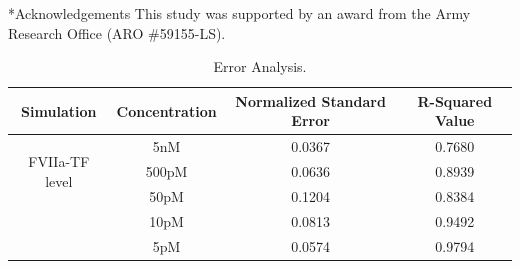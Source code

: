 \documentclass[12pt]{article}
\makeatletter
\renewcommand\section{\@startsection
	{subsection}{2}{0mm}
	{-0.2in}
	{0.05\baselineskip}
	{\normalfont\large\bfseries}}
\makeatother
\begin{document}
\section*{Acknowledgements}
This study was supported by an award from the Army Research Office (ARO \#59155-LS).
\clearpage

%


\clearpage

\begin{table}[h]
\centering
\caption{Error Analysis.}
\label{table:Error-Analysis}
\begin{center}
\begin{tabular}{ |c|c|c|c| } 
\hline
Simulation&Concentration& Normalized Standard Error & R-Squared Value \\
\hline
\multirow{3}{4em}{FVIIa-TF level} & 5nM & 0.0367 & 0.7680\\ 
& 500pM & 0.0636 & 0.8939\\
& 50pM & 0.1204 & 0.8384\\ 
& 10pM & 0.0813 & 0.9492\\
& 5pM & 0.0574 & 0.9794\\ 
\hline
\end{tabular}
\end{center}
\end{table}
\end{document}
